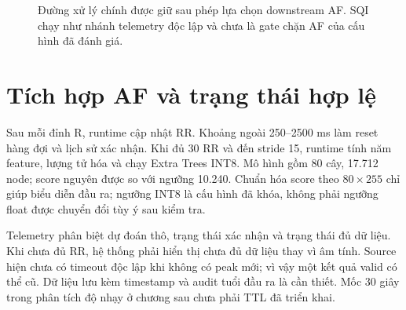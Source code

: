 \documentclass[12pt,a4paper,oneside]{report}
\newcommand{\RR}{\operatorname{RR}}
\begin{document}
\begin{figure}[H]
\centering
{}
\caption{Đường xử lý chính được giữ sau phép lựa chọn downstream AF. SQI chạy như nhánh telemetry độc lập và chưa là gate chặn AF của cấu hình đã đánh giá.}
\label{fig:pipeline}
\end{figure}

\section{Tích hợp AF và trạng thái hợp lệ}
Sau mỗi đỉnh R, runtime cập nhật RR. Khoảng ngoài 250--2500 ms làm reset hàng đợi và lịch sử xác nhận. Khi đủ 30 RR và đến stride 15, runtime tính năm feature, lượng tử hóa và chạy Extra Trees INT8. Mô hình gồm 80 cây, 17.712 node; score nguyên được so với ngưỡng 10.240. Chuẩn hóa score theo $80\times255$ chỉ giúp biểu diễn đầu ra; ngưỡng INT8 là cấu hình đã khóa, không phải ngưỡng float được chuyển đổi tùy ý sau kiểm tra.

Telemetry phân biệt dự đoán thô, trạng thái xác nhận và trạng thái đủ dữ liệu. Khi chưa đủ RR, hệ thống phải hiển thị chưa đủ dữ liệu thay vì âm tính. Source hiện chưa có timeout độc lập khi không có peak mới; vì vậy một kết quả valid có thể cũ. Dữ liệu lưu kèm timestamp và audit tuổi đầu ra là cần thiết. Mốc 30 giây trong phân tích độ nhạy ở chương sau chưa phải TTL đã triển khai.
\end{document}
